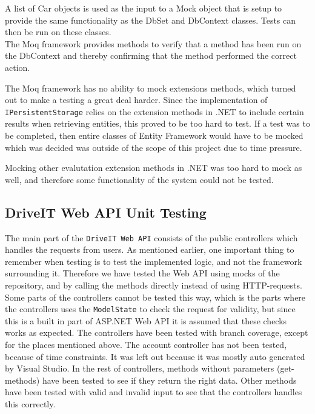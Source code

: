 A list of Car objects is used as the input to a Mock object that is setup to provide the same functionality as the DbSet and DbContext classes. Tests can then be run on these classes.\\
The Moq framework provides methods to verify that a method has been run on the DbContext and thereby confirming that the method performed the correct action. 

The Moq framework has no ability to mock extensions methods, which turned out to make a testing a great deal harder. Since the implementation of \texttt{IPersistentStorage} relies on the extension methods in .NET to include certain results when retrieving entities, this proved to be too hard to test. If a test was to be completed, then entire classes of Entity Framework would have to be mocked which was decided was outside of the scope of this project due to time pressure.

Mocking other evalutation extension methods in .NET was too hard to mock as well, and therefore some functionality of the system could not be tested.

\subsection{DriveIT Web API Unit Testing}
The main part of the \texttt{DriveIT Web API} consists of the public controllers which handles the requests from users. As mentioned earlier, one important thing to remember when testing is to test the implemented logic, and not the framework surrounding it. Therefore we have tested the Web API using mocks of the repository, and by calling the methods directly instead of using HTTP-requests.
Some parts of the controllers cannot be tested this way, which is the parts where the controllers uses the \texttt{ModelState} to check the request for validity, but since this is a built in part of ASP.NET Web API it is assumed that these checks works as expected.
The controllers have been tested with branch coverage, except for the places mentioned above.
The account controller has not been tested, because of time constraints. It was left out because it was mostly auto generated by Visual Studio. 
In the rest of controllers, methods without parameters (get-methods) have been tested to see if they return the right data. Other methods have been tested with valid and invalid input to see that the controllers handles this correctly.